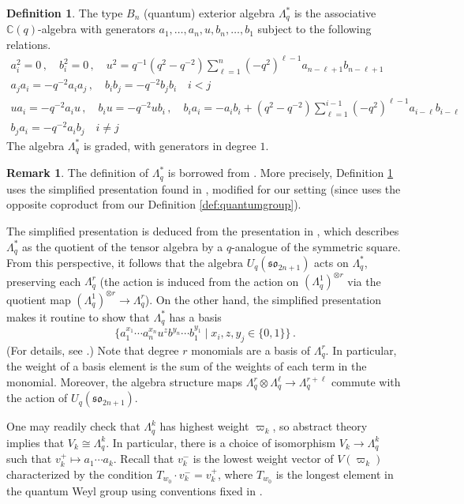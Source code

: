 \documentclass[10pt]{amsart}
\numberwithin{equation}{section}
\theoremstyle{definition}
\newtheorem{rem}[thm]{Remark}
\newtheorem{defn}[thm]{Definition}
\def\C{{\mathbb C}}
\newcommand{\son}[1][2n+1]{\mathfrak{so}_{#1}}
\begin{document}
\begin{defn}\label{def:q-exterior-algebra}
The type $B_n$ (quantum) exterior algebra $\Lambda^*_q$ is the associative $\C(q)$-algebra 
with generators $a_1, \dots, a_n, u, b_n, \dots, b_1$ subject to the following relations.
\begin{gather*}
a_i^2 = 0 \, , \quad b_i^2 = 0 \, , \quad u^2 = q^{-1}(q^2-q^{-2})\sum_{\ell=1}^n (-q^2)^{\ell-1}a_{n-\ell+1}b_{n-\ell+1} \\
a_ja_i = -q^{-2}a_ia_j \, , \quad b_ib_j = -q^{-2}b_jb_i \quad i< j \\
ua_i = -q^{-2}a_iu \, , \quad b_iu= -q^{-2}ub_i \, , \quad b_ia_i = -a_ib_i + (q^2-q^{-2})\sum_{\ell=1}^{i-1}(-q^2)^{\ell-1}a_{i-\ell}b_{i-\ell} \\
b_ja_i = -q^{-2}a_ib_j \quad i\ne j
\end{gather*}
The algebra $\Lambda_q^*$ is graded, with generators in degree $1$.
\end{defn}

\begin{rem}
The definition of $\Lambda_q^*$ is borrowed from \cite[Definition 3.43]{BodWu}. 
More precisely, Definition \ref{def:q-exterior-algebra} uses the simplified presentation found in \cite[Corollary 3.45]{BodWu}, 
modified for our setting (since \cite{BodWu} uses the opposite coproduct from our Definition \ref{def:quantumgroup}).
\end{rem}

The simplified presentation is deduced from the presentation in \cite[Definition 3.43]{BodWu}, 
which describes $\Lambda_q^*$ as the quotient of the tensor algebra 
by a $q$-analogue of the symmetric square. 
From this perspective, it follows that the algebra $U_q(\son)$ acts on $\Lambda_q^*$,
preserving each $\Lambda_q^r$ (the action is induced from the action on $(\Lambda_q^1)^{\otimes r}$ 
via the quotient map $(\Lambda_q^1)^{\otimes r}\rightarrow \Lambda_q^r$).
On the other hand, the simplified presentation makes it routine to show that $\Lambda_q^*$ has a basis 
\[
\{a_1^{x_1}\cdots a_n^{x_n}u^{z}b^{y_n}\cdots b_1^{y_1} \mid x_i, z, y_j\in \{0,1\}\} \, .
\]
(For details, see \cite[Theorem 3.47]{BodWu}.) Note that degree $r$ monomials are a basis of $\Lambda_q^r$.
In particular, the weight of a basis element is the sum of the weights of each term in the monomial. 
Moreover, the algebra structure maps $\Lambda_q^{r} \otimes \Lambda_q^{\ell}\rightarrow \Lambda_q^{r+\ell}$ 
commute with the action of $U_q(\son)$.

One may readily check that $\Lambda_q^k$ has highest weight $\varpi_k$,
so abstract theory implies that $V_k\cong \Lambda_q^k$. 
In particular, there is a choice of isomorphism $V_k\longrightarrow \Lambda_q^k$ such that $v_k^+\mapsto a_1\cdots a_k$. 
Recall that $v_k^-$ is the lowest weight vector of $V(\varpi_k)$ characterized by the condition $T_{w_0}\cdot v_k^-= v_k^+$, 
where $T_{w_0}$ is the longest element in the quantum Weyl group using conventions fixed in \cite[Section 3.2]{BER}. 
\end{document}
